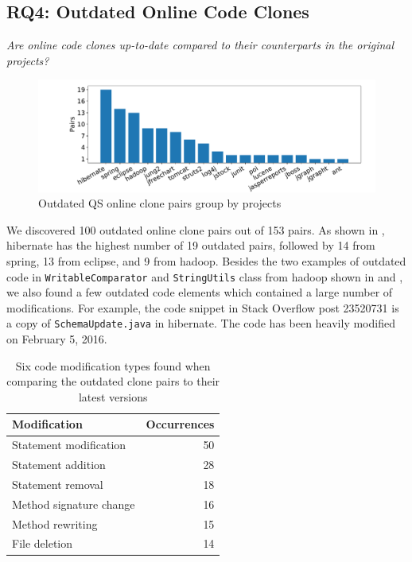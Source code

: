 \documentclass[10pt,journal,compsoc]{IEEEtran}
\begin{document}
\subsection{RQ4: Outdated Online Code Clones}
\vspace{0.25cm}
\textit{Are online code clones up-to-date compared to their counterparts in the original projects?}
\vspace{0.25cm}

\begin{figure}
	\centering
	\includegraphics[width=0.8\linewidth]{outdated}
	\caption{Outdated QS online clone pairs group by projects}
	\label{fig:outdated}
\end{figure}

We discovered 100 outdated online clone pairs out of 153 pairs. As shown in
, \textsf{hibernate} has the highest number of 19 outdated
pairs, followed by 14 from \textsf{spring}, 13 from \textsf{eclipse}, and 9 from
\textsf{hadoop}. Besides the two examples of outdated code in %
{\small{\texttt{WritableComparator}}} and
{\small{\texttt{StringUtils}}} class from \textsf{hadoop} shown in
 and , we also found a few
outdated code elements which contained a large number of modifications. For
example, the code snippet in Stack Overflow post 23520731 is a copy of
{\small{\texttt{SchemaUpdate.java}}} in \textsf{hibernate}. The code has been
heavily modified on February 5, 2016.


\begin{table}
	\centering
	\caption{Six code modification types found when comparing the outdated clone pairs to their latest versions}
	\label{tab:mod_types}
		\begin{tabular}{lr}
			\toprule
			Modification & Occurrences \\
			\midrule
			Statement modification & 50 \\
			Statement addition & 28 \\
			Statement removal & 18 \\
			Method signature change & 16 \\
			Method rewriting & 15 \\
			File deletion & 14 \\
			\bottomrule 
		\end{tabular}
\end{table}
\end{document}

